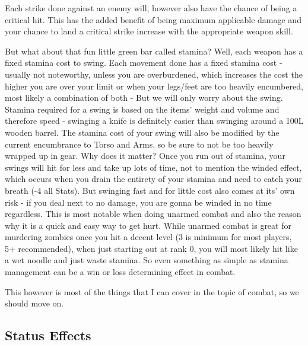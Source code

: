 \documentclass[11pt]{report}
\begin{document}
Each strike done against an enemy will, however also have the chance of being a critical hit. This has the added benefit of being maximum applicable damage and your chance to land a critical strike increase with the appropriate weapon skill.

But what about that fun little green bar called stamina? Well, each weapon has a fixed stamina cost to swing. Each movement done has a fixed stamina cost - usually not noteworthy, unless you are overburdened, which increases the cost the higher you are over your limit or when your legs/feet are too heavily encumbered, most likely a combination of both - But we will only worry about the swing. Stamina required for a swing is based on the items' weight and volume and therefore speed - swinging a knife is definitely easier than swinging around a 100L wooden barrel. The stamina cost of your swing will also be modified by the current encumbrance to Torso and Arms. so be sure to not be too heavily wrapped up in gear. Why does it matter? Once you run out of stamina, your swings will hit for less and take up lots of time, not to mention the winded effect, which occurs when you drain the entirety of your stamina and need to catch your breath (-4 all Stats). But swinging fast and for little cost also comes at its' own risk - if you deal next to no damage, you are gonna be winded in no time regardless. This is most notable when doing unarmed combat and also the reason why it is a quick and easy way to get hurt. While unarmed combat is great for murdering zombies once you hit a decent level (3 is minimum for most players, 5+ recommended), when just starting out at rank 0, you will most likely hit like a wet noodle and just waste stamina. So even something as simple as stamina management can be a win or loss determining effect in combat.

This however is most of the things that I can cover in the topic of combat, so we should move on.

\subsection{Status Effects}
\end{document}
